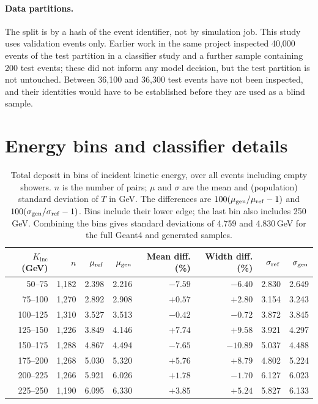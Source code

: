 \documentclass[11pt]{article}
\newcommand{\Kinc}{K_{\mathrm{inc}}}
\begin{document}
\paragraph{Data partitions.} The split is by a hash of the event identifier, not by simulation job. This study uses validation events only. Earlier work in the same project inspected 40,000 events of the test partition in a classifier study and a further sample containing 200 test events; these did not inform any model decision, but the test partition is not untouched. Between 36,100 and 36,300 test events have not been inspected, and their identities would have to be established before they are used as a blind sample.

\section{Energy bins and classifier details}
\label{app:additional}

\begin{table}[H]
\centering
\caption{Total deposit in bins of incident kinetic energy, over all events including empty showers. $n$ is the number of pairs; $\mu$ and $\sigma$ are the mean and (population) standard deviation of $T$ in GeV. The differences are $100(\mu_{\rm gen}/\mu_{\rm ref}-1)$ and $100(\sigma_{\rm gen}/\sigma_{\rm ref}-1)$. Bins include their lower edge; the last bin also includes 250\,GeV. Combining the bins gives standard deviations of 4.759 and 4.830\,GeV for the full Geant4 and generated samples.}
\label{tab:energy_bins}
\small
\begin{tabular}{@{}rrrrrrrr@{}}
\toprule
$\Kinc$ (GeV) & $n$ & $\mu_{\rm ref}$ & $\mu_{\rm gen}$ & Mean diff. (\%) & Width diff. (\%) & $\sigma_{\rm ref}$ & $\sigma_{\rm gen}$ \\
\midrule
50--75 & 1,182 & 2.398 & 2.216 & $-7.59$ & $-6.40$ & 2.830 & 2.649 \\
75--100 & 1,270 & 2.892 & 2.908 & $+0.57$ & $+2.80$ & 3.154 & 3.243 \\
100--125 & 1,310 & 3.527 & 3.513 & $-0.42$ & $-0.72$ & 3.872 & 3.845 \\
125--150 & 1,226 & 3.849 & 4.146 & $+7.74$ & $+9.58$ & 3.921 & 4.297 \\
150--175 & 1,288 & 4.867 & 4.494 & $-7.65$ & $-10.89$ & 5.037 & 4.488 \\
175--200 & 1,268 & 5.030 & 5.320 & $+5.76$ & $+8.79$ & 4.802 & 5.224 \\
200--225 & 1,266 & 5.921 & 6.026 & $+1.78$ & $-1.70$ & 6.127 & 6.023 \\
225--250 & 1,190 & 6.095 & 6.330 & $+3.85$ & $+5.24$ & 5.827 & 6.133 \\
\bottomrule
\end{tabular}
\end{table}
\end{document}

